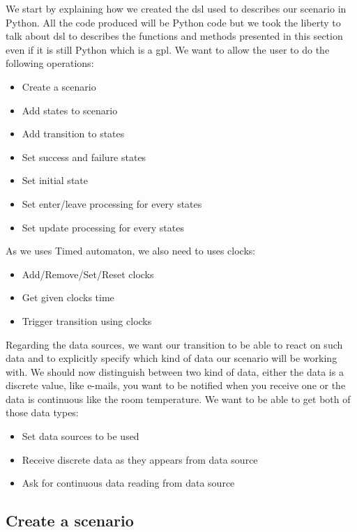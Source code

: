 \documentclass[12pt]{article}
\theoremstyle{definition}
\theoremstyle{definition}
\theoremstyle{remark}
\begin{document}

We start by explaining how we created the \gls{dsl} used to describes our scenario in Python. All the code produced will be Python code but we took the liberty to talk about \gls{dsl} to describes the functions and methods presented in this section even if it is still Python which is a \gls{gpl}. We want to allow the user to do the following operations:

\begin{itemize}
\item Create a scenario
\item Add states to scenario
\item Add transition to states
\item Set success and failure states
\item Set initial state
\item Set enter/leave processing for every states
\item Set update processing for every states
\end{itemize}

As we uses Timed automaton, we also need to uses clocks:

\begin{itemize}
\item Add/Remove/Set/Reset clocks
\item Get given clocks time
\item Trigger transition using clocks
\end{itemize}

Regarding the data sources, we want our transition to be able to react on such data and to explicitly specify which kind of data our scenario will be working with. We should now distinguish between two kind of data, either the data is a discrete value, like e-mails, you want to be notified when you receive one or the data is continuous like the room temperature. We want to be able to get both of those data types:

\begin{itemize}
\item Set data sources to be used
\item Receive discrete data as they appears from data source
\item Ask for continuous data reading from data source
\end{itemize}


\subsection{Create a scenario}
\end{document}
